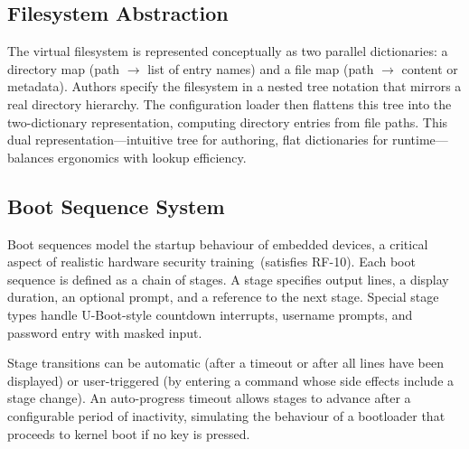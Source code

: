 \subsection{Filesystem Abstraction}\label{subsec:filesystem}

The virtual filesystem is represented conceptually as two parallel dictionaries: a directory map (path $\rightarrow$ list of entry names) and a file map (path $\rightarrow$ content or metadata). Authors specify the filesystem in a nested tree notation that mirrors a real directory hierarchy. The configuration loader then flattens this tree into the two-dictionary representation, computing directory entries from file paths. This dual representation---intuitive tree for authoring, flat dictionaries for runtime---balances ergonomics with lookup efficiency.

\subsection{Boot Sequence System}\label{subsec:boot-sequence}

Boot sequences model the startup behaviour of embedded devices, a critical aspect of realistic hardware security training~(satisfies RF-10). Each boot sequence is defined as a chain of stages. A stage specifies output lines, a display duration, an optional prompt, and a reference to the next stage. Special stage types handle U-Boot-style countdown interrupts, username prompts, and password entry with masked input.

Stage transitions can be automatic (after a timeout or after all lines have been displayed) or user-triggered (by entering a command whose side effects include a stage change). An auto-progress timeout allows stages to advance after a configurable period of inactivity, simulating the behaviour of a bootloader that proceeds to kernel boot if no key is pressed.

